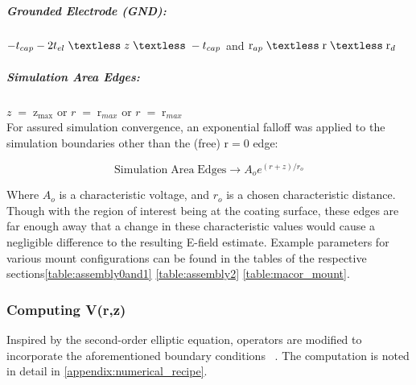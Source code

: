 \subparagraph*{Grounded Electrode (GND):}
$ -t_{cap} -2t_{el} \; \textless \; z \; \textless \; -t_{cap} $ and $\mathrm{r}_{ap} \; \textless \;\mathrm{r} \; \textless \;\mathrm{r}_{d} $

\subparagraph*{Simulation Area Edges:}
$ z \; = \;\mathrm{z}_\mathrm{max} $ or  $r \; = \;\mathrm{r}_{max}$ or  $r \; = \;\mathrm{r}_{max}$ 
\\

\noindent For assured simulation convergence, an exponential falloff was applied to the simulation boundaries other than the (free) $\mathrm{r} = 0$ edge:

\begin{equation}
    \mathrm{Simulation \; Area \; Edges} \rightarrow A_o e^{(r+z)/r_o}
\end{equation}

Where $A_o$ is a characteristic voltage, and $r_o$ is a chosen characteristic distance. Though with the region of interest being at the coating surface, these edges are far enough away that a change in these characteristic values would cause a negligible difference to the resulting E-field estimate. Example parameters for various mount configurations can be found in the tables of the respective sections\autoref{table:assembly0and1} \autoref{table:assembly2} \autoref{table:macor_mount}.
\subsubsection*{Computing V(r,z)}

Inspired by the second-order elliptic equation, operators are modified to incorporate the aforementioned boundary conditions ~\cite{Press:2007}. The computation is noted in detail in \autoref{appendix:numerical_recipe}.

\iffalse

